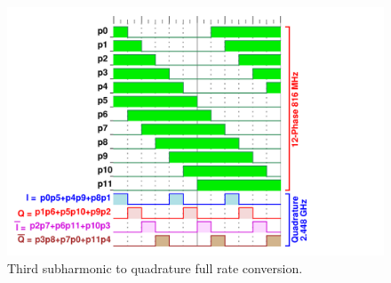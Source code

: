 			\begin{figure}[htb!]
			        \centering
			        \includegraphics[width=1.0\textwidth, angle=0]{./figs/design/ro_12ph_quad}
			    \caption{Third subharmonic to quadrature full rate conversion.}
			    \label{fig:ro_phases}
			\end{figure}

		\FloatBarrier%
